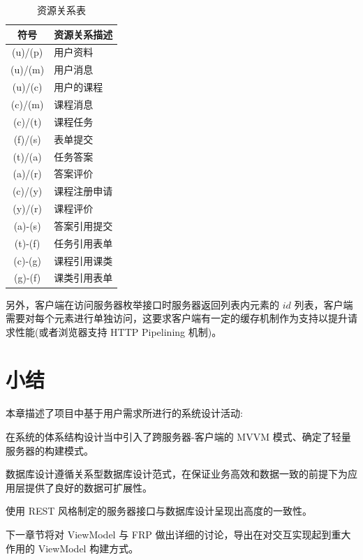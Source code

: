 \begin{table}[!h]
  \begin{center}
    \noindent
    \ttfamily
    \begin{tabular}{|c|l|}
      \hline
      \textbf{符号} & \textbf{资源关系描述} \\ \hline
      (u)/(p) & 用户资料     \\ \hline
      (u)/(m) & 用户消息     \\ \hline
      (u)/(c) & 用户的课程   \\ \hline
      (c)/(m) & 课程消息     \\ \hline
      (c)/(t) & 课程任务     \\ \hline
      (f)/(s) & 表单提交     \\ \hline
      (t)/(a) & 任务答案     \\ \hline
      (a)/(r) & 答案评价     \\ \hline
      (c)/(y) & 课程注册申请 \\ \hline
      (y)/(r) & 课程评价     \\ \hline
      (a)-(s) & 答案引用提交 \\ \hline
      (t)-(f) & 任务引用表单 \\ \hline
      (c)-(g) & 课程引用课类 \\ \hline
      (g)-(f) & 课类引用表单 \\ \hline
    \end{tabular}
    \caption{资源关系表\label{APURIRelation}}
  \end{center}
\end{table}

另外，客户端在访问服务器枚举接口时服务器返回列表内元素的 $id$ 列表，客户端需要对每个元素进行单独访问，这要求客户端有一定的缓存机制作为支持以提升请求性能(或者浏览器支持 HTTP Pipelining 机制)。

\newpage

\section{小结}

本章描述了项目中基于用户需求所进行的系统设计活动:

在系统的体系结构设计当中引入了跨服务器-客户端的 MVVM 模式、确定了轻量服务器的构建模式。

数据库设计遵循关系型数据库设计范式，在保证业务高效和数据一致的前提下为应用层提供了良好的数据可扩展性。

使用 REST 风格制定的服务器接口与数据库设计呈现出高度的一致性。

下一章节将对 ViewModel 与 FRP 做出详细的讨论，导出在对交互实现起到重大作用的 ViewModel 构建方式。

